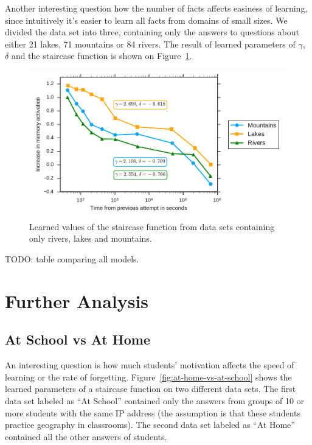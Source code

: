 Another interesting question how the number of facts affects easiness of learning, since intuitively it's easier to learn all facts from domains of small sizes. We divided the data set into three, containing only the answers to questions about either 21 lakes, 71 mountains or 84 rivers. The result of learned parameters of $\gamma$, $\delta$ and the staircase function is shown on Figure~\ref{fig:lakes-rivers-mountains}.

\begin{figure}[htbp]
  \centering
  \includegraphics[width=\textwidth]{img/lakes-rivers-mountains}
  \caption{Learned values of the staircase function from data sets containing only rivers, lakes and mountains.}
  \label{fig:lakes-rivers-mountains}
\end{figure}

TODO: table comparing all models.

\section{Further Analysis}
\label{further-analysis}

\subsection{At School vs At Home}

An interesting question is how much students' motivation affects the speed of learning or the rate of forgetting. Figure~\ref{fig:at-home-vs-at-school} shows the learned parameters of a staircase function on two different data sets. The first data set labeled as ``At School'' contained only the answers from groups of 10 or more students with the same IP address (the assumption is that these students practice geography in classrooms). The second data set labeled as ``At Home'' contained all the other answers of students.

